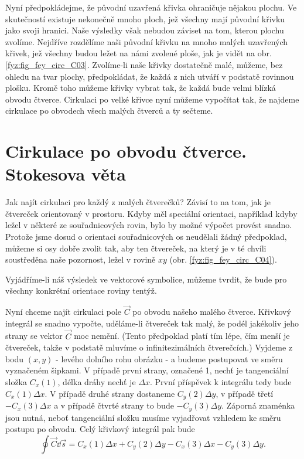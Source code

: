     Nyní předpokládejme, že původní uzavřená křivka ohraničuje nějakou plochu. Ve skutečností 
    existuje nekonečně mnoho ploch, jež všechny mají původní křivku jako svoji hranici. Naše 
    výsledky však nebudou záviset na tom, kterou plochu zvolíme. Nejdříve rozdělíme naši původní 
    křivku na mnoho malých uzavřených křivek, jež všechny budou ležet na námi zvolené ploše, jak je 
    vidět na obr. \ref{fyz:fig_fey_circ_C03}. Zvolíme-li naše křivky dostatečně malé, můžeme, bez 
    ohledu na tvar plochy, předpokládat, že každá z nich utváří v podstatě rovinnou plošku. Kromě 
    toho můžeme křivky vybrat tak, že každá bude velmi blízká obvodu čtverce. Cirkulaci po velké 
    křivce nyní můžeme vypočítat tak, že najdeme cirkulace po obvodech všech malých čtverců a ty 
    sečteme. 

     
  \section{Cirkulace po obvodu čtverce. Stokesova věta}
    Jak najít cirkulaci pro každý z malých čtverečků? Závisí to na tom, jak je čtvereček 
    orientovaný v prostoru. Kdyby měl speciální orientaci, například kdyby ležel v některé ze 
    souřadnicových rovin, bylo by možné výpočet provést snadno. Protože jsme dosud o orientaci 
    souřadnicových os neudělali žádný předpoklad, můžeme si osy dobře zvolit tak, aby ten čtvereček, 
    na který je v té chvíli soustředěna naše pozornost, ležel v rovině \(xy\) (obr. 
    \ref{fyz:fig_fey_circ_C04}).
   
    Vyjádříme-li náš výsledek ve vektorové symbolice, můžeme tvrdit, že bude pro všechny konkrétní 
    orientace roviny tentýž.

    Nyní chceme najít cirkulaci pole \(\vec{C}\) po obvodu našeho malého čtverce. Křivkový 
    integrál se snadno vypočte, uděláme-li čtvereček tak malý, že podél jakékoliv jeho strany se 
    vektor \(\vec{C}\) moc nemění. (Tento předpoklad platí tím lépe, čím menší je čtvereček, takže v 
    podstatě mluvíme o infinitezimálních čtverečcích.) Vyjdeme z bodu \((x, y)\) - levého dolního 
    rohu obrázku - a budeme postupovat ve směru vyznačeném šipkami. V případě první strany, označené 
    1, nechť je tangenciální složka \(C_x(1)\), délka dráhy nechť je \(\Delta x\). První příspěvek k 
    integrálu tedy bude \(C_x(1)\Delta x\). V případě druhé strany dostaneme \(C_y(2)\Delta y\), v 
    případě třetí \(-C_x(3)\Delta x\) a v případě čtvrté strany to bude \(-C_y(3)\Delta y\). Záporná 
    znaménka jsou nutná, neboť tangenciální složku musíme vyjadřovat vzhledem ke směru postupu po 
    obvodu. Celý křivkový integrál pak bude
    \begin{equation}\label{fyz:eq_fey_circ2}
      \oint\vec{C}\dd{\vec{s}} = C_x(1)\Delta x + C_y(2)\Delta y - C_x(3)\Delta x - C_y(3)\Delta y.  
    \end{equation}      

